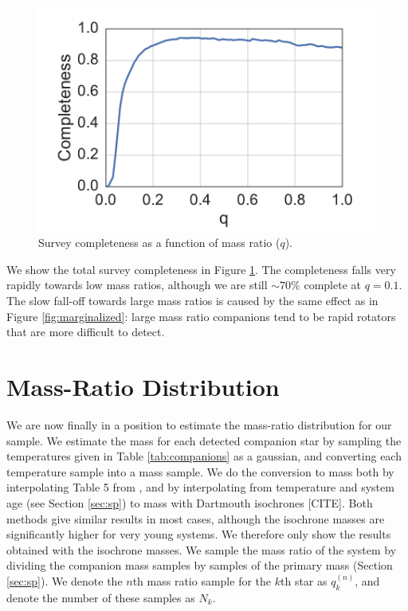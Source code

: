 \documentclass{emulateapj}
\begin{document}
\begin{figure}
\includegraphics[width=\columnwidth]{SurveyCompleteness.pdf}
\caption{Survey completeness as a function of mass ratio ($q$).}
\label{fig:completeness}
\end{figure}

We show the total survey completeness in Figure \ref{fig:completeness}. The completeness falls very rapidly towards low mass ratios, although we are still $\sim 70\%$ complete at $q = 0.1$. The slow fall-off towards large mass ratios is caused by the same effect as in Figure \ref{fig:marginalized}: large mass ratio companions tend to be rapid rotators that are more difficult to detect.

\section{Mass-Ratio Distribution}
\label{sec:mrd}

We are now finally in a position to estimate the mass-ratio distribution for our sample. We estimate the mass for each detected companion star by sampling the temperatures given in Table \ref{tab:companions} as a gaussian, and converting each temperature sample into a mass sample. We do the conversion to mass both by interpolating Table 5 from \citet{Pecaut2013}, and by interpolating from temperature and system age (see Section \ref{sec:sp}) to mass with Dartmouth isochrones [CITE]. Both methods give similar results in most cases, although the isochrone masses are significantly higher for very young systems. We therefore only show the results obtained with the isochrone masses. We sample the mass ratio of the system by dividing the companion mass samples by samples of the primary mass (Section \ref{sec:sp}). We denote the $n$th mass ratio sample for the $k$th star as $q_k^{(n)}$, and denote the number of these samples as $N_k$.
\end{document}
